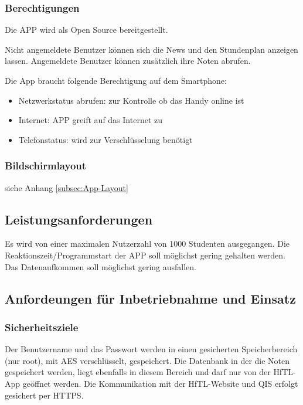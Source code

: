 \subsubsection{Berechtigungen}

Die APP wird als Open Source bereitgestellt.

Nicht angemeldete Benutzer können sich die News und den Stundenplan anzeigen lassen. Angemeldete Benutzer können zusätzlich ihre Noten abrufen.

Die App braucht folgende Berechtigung auf dem Smartphone:
\begin{itemize}
	\item Netzwerkstatus abrufen: zur Kontrolle ob das Handy online ist
	\item Internet: APP greift auf das Internet zu
	\item Telefonstatus: wird zur Verschlüsselung benötigt
\end{itemize}




\subsubsection{Bildschirmlayout}
siehe Anhang \ref{subsec:App-Layout}










\subsection{\textbf{Leistungsanforderungen}}
Es wird von einer maximalen Nutzerzahl von 1000 Studenten ausgegangen.
Die Reaktionszeit/Programmstart der APP soll möglichst gering gehalten werden.
Das Datenaufkommen soll möglichst gering ausfallen.


\subsection{\textbf{Anfordeungen für Inbetriebnahme und Einsatz}}

\subsubsection{Sicherheitsziele}
Der Benutzername und das Passwort werden in einen gesicherten Speicherbereich (nur root), mit \acs{AES} verschlüsselt, gespeichert.
Die Datenbank in der die Noten gespeichert werden, liegt ebenfalls in diesem Bereich und darf nur von der \acs{HfTL}-App geöffnet werden.
Die Kommunikation mit der \acs{HfTL}-Website und \acs{QIS} erfolgt gesichert per \acs{HTTPS}.



